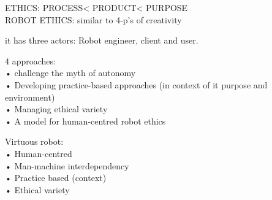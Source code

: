 \begin{draft}
  ETHICS\@: PROCESS< PRODUCT< PURPOSE\\
  ROBOT ETHICS\@: similar to 4-p’s of creativity




  \autocite{McBride2013}

  it has three actors: Robot engineer, client and user.

  4 approaches:\\
  •	challenge the myth of autonomy\\
  •	Developing practice-based approaches (in context of it purpose and environment)\\
  •	Managing ethical variety\\
  •	A model for human-centred robot ethics

  Virtuous robot:\\
  •	Human-centred\\
  •	Man-machine interdependency\\
  •	Practice based (context)\\
  •	Ethical variety
\end{draft}%

\stopcontents[chapters]
